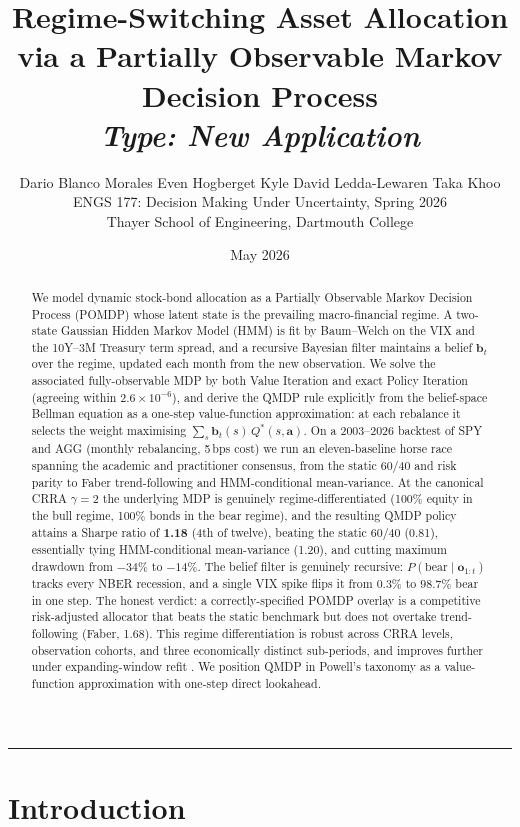 \documentclass[11pt]{article}
\title{
  \large \textbf{Regime-Switching Asset Allocation via a Partially Observable Markov Decision Process} \\[2pt]
  \normalsize \textit{Type: New Application}
}
\author{
  Dario Blanco Morales \quad Even Hogberget \quad Kyle David Ledda-Lewaren \quad Taka Khoo \\[2pt]
  \small ENGS 177: Decision Making Under Uncertainty, Spring 2026 \\
  \small Thayer School of Engineering, Dartmouth College
}
\date{May 2026}
\theoremstyle{plain1}
\theoremstyle{definition1}
\newcommand{\1}{\mathbf{1}}
\newcommand{\bel}{\mathbf{b}}
\begin{document}
\maketitle

\begin{abstract}\noindent
We model dynamic stock-bond allocation as a Partially Observable Markov Decision Process (POMDP) whose latent state is the prevailing macro-financial regime. A two-state Gaussian Hidden Markov Model (HMM) is fit by Baum--Welch on the VIX and the 10Y--3M Treasury term spread, and a recursive Bayesian filter maintains a belief $\bel_t$ over the regime, updated each month from the new observation. We solve the associated fully-observable MDP by both Value Iteration and exact Policy Iteration (agreeing within $2.6\times 10^{-6}$), and derive the QMDP rule \cite{littman1995} explicitly from the belief-space Bellman equation as a one-step value-function approximation: at each rebalance it selects the weight maximising $\sum_s \bel_t(s)\,Q^\ast(s,\mathbf a)$. On a 2003--2026 backtest of SPY and AGG (monthly rebalancing, 5\,bps cost) we run an eleven-baseline horse race spanning the academic and practitioner consensus, from the static 60/40 and risk parity to Faber trend-following and HMM-conditional mean-variance. At the canonical CRRA $\gamma{=}2$ the underlying MDP is genuinely regime-differentiated (100\% equity in the bull regime, 100\% bonds in the bear regime), and the resulting QMDP policy attains a Sharpe ratio of \textbf{1.18} (4th of twelve), beating the static 60/40 (0.81), essentially tying HMM-conditional mean-variance (1.20), and cutting maximum drawdown from $-34\%$ to $-14\%$. The belief filter is genuinely recursive: $P(\text{bear}\mid\mathbf o_{1:t})$ tracks every NBER recession, and a single VIX spike flips it from $0.3\%$ to $98.7\%$ bear in one step. The honest verdict: a correctly-specified POMDP overlay is a competitive risk-adjusted allocator that beats the static benchmark but does not overtake trend-following (Faber, 1.68). This regime differentiation is robust across CRRA levels, observation cohorts, and three economically distinct sub-periods, and improves further under expanding-window refit \cite{nystrup2018}. We position QMDP in Powell's \cite{powell2019} taxonomy as a value-function approximation with one-step direct lookahead.
\end{abstract}

\medskip\hrule\medskip

\section{Introduction}\label{sec:intro}
\end{document}
